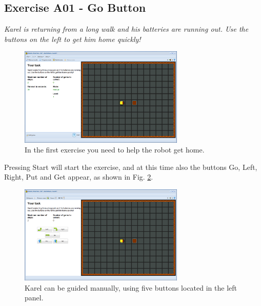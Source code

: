 \documentclass[article,A4,12pt]{llncs}
\begin{document}
\newpage
\subsection{Exercise A01 - Go Button}

{\em Karel is returning from a long walk and his batteries are running out. 
Use the buttons on the left to get him home quickly! }

\begin{figure}[!ht]
\begin{center}
\includegraphics[width=0.7\textwidth]{img/a01.png}
\end{center}
\vspace{-4mm}
\caption{In the first exercise you need to help the robot get home.}
\label{fig:a01}
\end{figure}
\noindent
Pressing Start will start 
the exercise, and at this time also the buttons Go, Left, Right, Put and Get appear, 
as shown in Fig. \ref{fig:a01b}.


\begin{figure}[!ht]
\begin{center}
\includegraphics[width=0.7\textwidth]{img/a01b.png}
\end{center}
\vspace{-4mm}
\caption{Karel can be guided manually, using five buttons located in the left panel.}
\label{fig:a01b}
\end{figure}
\end{document}
